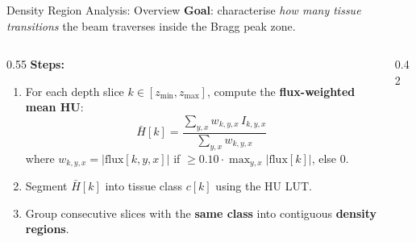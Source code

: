 \documentclass[aspectratio=169, 10pt]{beamer}
\begin{document}
\begin{frame}{Density Region Analysis: Overview}
  \textbf{Goal}: characterise \emph{how many tissue transitions} the beam
  traverses inside the Bragg peak zone.

  \vspace{6pt}
  \begin{columns}[T]
    \begin{column}{0.55\textwidth}
      \textbf{Steps:}
      \begin{enumerate}
        \item For each depth slice $k \in [z_{\min}, z_{\max}]$, compute the
              \textbf{flux-weighted mean HU}:
              \begin{equation*}
                \bar{H}[k] = \frac{\sum_{y,x} w_{k,y,x}\, I_{k,y,x}}
                                   {\sum_{y,x} w_{k,y,x}}
              \end{equation*}
              where $w_{k,y,x} = |\text{flux}[k,y,x]|$ if
              $\geq 0.10 \cdot \max_{\!y,x}|\text{flux}[k]|$, else $0$.
        \item Segment $\bar{H}[k]$ into tissue class $c[k]$ using the HU LUT.
        \item Group consecutive slices with the \textbf{same class} into
              contiguous \textbf{density regions}.
      \end{enumerate}
    \end{column}
    \begin{column}{0.42\textwidth}
      \begin{center}
      \end{center}
    \end{column}
  \end{columns}
\end{frame}
\end{document}
